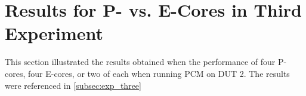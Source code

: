 \section{Results for P- vs. E-Cores in Third Experiment}\label{app:bonus-results}

This section illustrated the results obtained when the performance of four P-cores, four E-cores, or two of each when running PCM on DUT 2. The results were referenced in \cref{subsec:exp_three}



